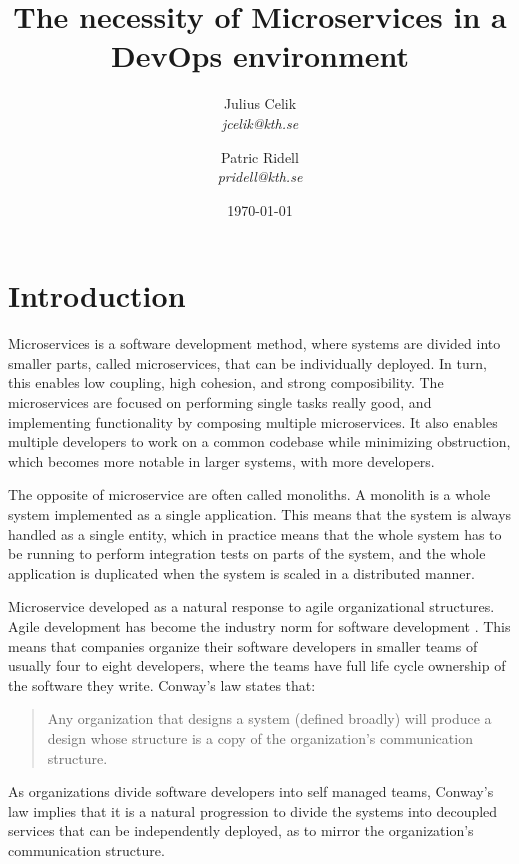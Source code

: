 \documentclass[a4paper]{article}
\title{The necessity of Microservices in a DevOps environment}
\author{
{Julius Celik}\\
\textit{
    jcelik@kth.se
} \and {Patric Ridell}\\
\textit{
    pridell@kth.se
}}
\date{\today{}}
\begin{document}
\maketitle


\section{Introduction}
Microservices is a software development method, where systems are divided into smaller parts, called microservices, that can be individually deployed. In turn, this enables low coupling, high cohesion, and strong composibility. The microservices are focused on performing single tasks really good, and implementing functionality by composing multiple microservices. It also enables multiple developers to work on a common codebase while minimizing obstruction, which becomes more notable in larger systems, with more developers.

The opposite of microservice are often called monoliths. A monolith is a whole system implemented as a single application. This means that the system is always handled as a single entity, which in practice means that the whole system has to be running to perform integration tests on parts of the system, and the whole application is duplicated when the system is scaled in a distributed manner.

Microservice developed as a natural response to agile organizational structures. Agile development has become the industry norm for software development \cite{Jeremiah}. This means that companies organize their software developers in smaller teams of usually four to eight developers, where the teams have full life cycle ownership of the software they write. Conway's law states that:
\begin{quote}
    Any organization that designs a system (defined broadly) will produce a design whose structure is a copy of the organization's communication structure. \cite{Conway}
\end{quote}

As organizations divide software developers into self managed teams, Conway's law implies that it is a natural progression to divide the systems into decoupled services that can be independently deployed, as to mirror the organization's communication structure.
\end{document}
